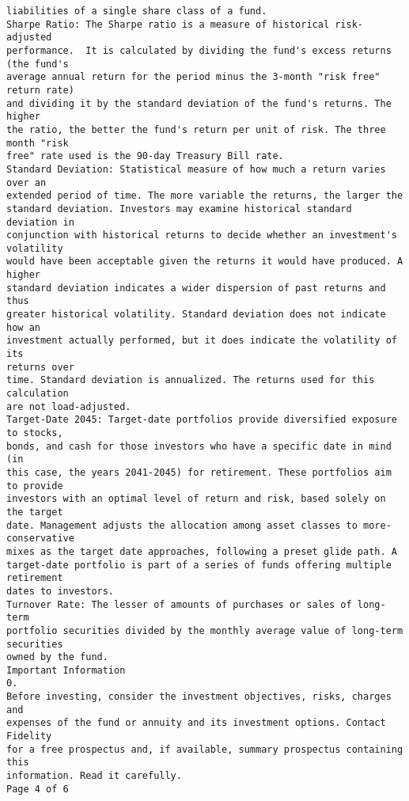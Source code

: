 \documentclass[11pt]{article}
\begin{document}
\begin{Verbatim}[commandchars=\\\{\}]
liabilities of a single share class of a fund.
Sharpe Ratio: The Sharpe ratio is a measure of historical risk-adjusted
performance.  It is calculated by dividing the fund's excess returns (the fund's
average annual return for the period minus the 3-month "risk free" return rate)
and dividing it by the standard deviation of the fund's returns. The higher
the ratio, the better the fund's return per unit of risk. The three month "risk
free" rate used is the 90-day Treasury Bill rate.
Standard Deviation: Statistical measure of how much a return varies over an
extended period of time. The more variable the returns, the larger the
standard deviation. Investors may examine historical standard deviation in
conjunction with historical returns to decide whether an investment's volatility
would have been acceptable given the returns it would have produced. A higher
standard deviation indicates a wider dispersion of past returns and thus
greater historical volatility. Standard deviation does not indicate how an
investment actually performed, but it does indicate the volatility of its
returns over
time. Standard deviation is annualized. The returns used for this calculation
are not load-adjusted.
Target-Date 2045: Target-date portfolios provide diversified exposure to stocks,
bonds, and cash for those investors who have a specific date in mind (in
this case, the years 2041-2045) for retirement. These portfolios aim to provide
investors with an optimal level of return and risk, based solely on the target
date. Management adjusts the allocation among asset classes to more-conservative
mixes as the target date approaches, following a preset glide path. A
target-date portfolio is part of a series of funds offering multiple retirement
dates to investors.
Turnover Rate: The lesser of amounts of purchases or sales of long-term
portfolio securities divided by the monthly average value of long-term
securities
owned by the fund.
Important Information
0.
Before investing, consider the investment objectives, risks, charges and
expenses of the fund or annuity and its investment options. Contact Fidelity
for a free prospectus and, if available, summary prospectus containing this
information. Read it carefully.
Page 4 of 6
    \end{Verbatim}
\end{document}
